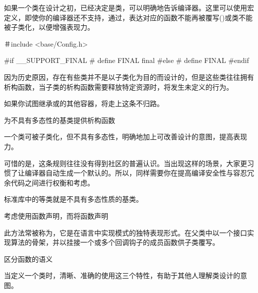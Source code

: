 \begin{content}
如果一个类在设计之初，已经决定是类，可以明确地告诉编译器。这里可以使用宏定义，即使你的编译器还不支持\cpp{}，通过，表达对应的函数不能再被覆写()或类不能被子类化，以便增强表现力。

\begin{leftbar}
\begin{c++}
＃include <base/Config.h>

#if __SUPPORT_FINAL
# define FINAL final
#else
# define FINAL
#endif
\end{c++}
\end{leftbar}

因为历史原因，存在有些类并不是以子类化为目的而设计的，但是这些类往往拥有析构函数，当子类的析构函数需要释放特定资源时，将发生未定义的行为。

如果你试图继承或的其他容器，将走上这条不归路。

\begin{regulation}
为不具有多态性的基类提供析构函数
\end{regulation}

一个类可被子类化，但不具有多态性，明确地加上可改善设计的意图，提高表现力。

可惜的是，这条规则往往没有得到社区的普遍认识。当出现这样的场景，大家更习惯了让编译器自动生成一个默认的。所以，同样需要你在提高编译安全性与容忍冗余代码之间进行权衡和考虑。

标准库中的等类就是不具有多态性质的基类。

\begin{regulation}
考虑使用函数声明，而将函数声明
\end{regulation}

此方法常被称为，它是在\cpp{}语言中实现模式的独特表现形式。在父类中以一个接口实现算法的骨架，并以挂接一个或多个回调钩子的成员函数供子类覆写。

\begin{regulation}
区分函数的语义
\end{regulation}

当定义一个类时，清晰、准确的使用这三个特性，有助于其他人理解类设计的意图。


\end{content}
